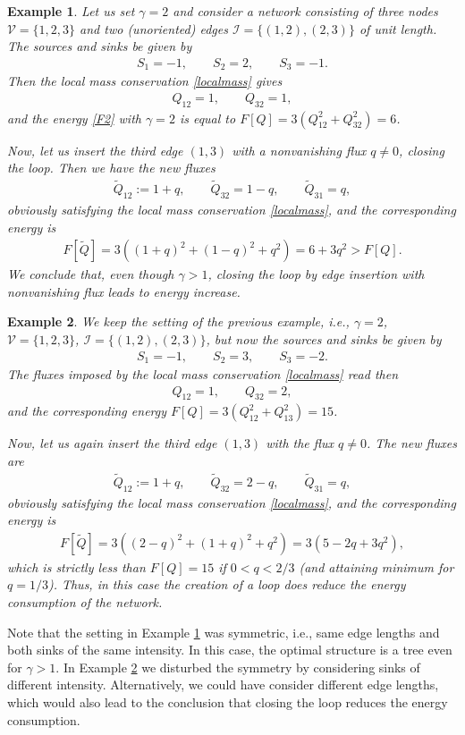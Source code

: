 \documentclass{article}
\numberwithin{equation}{section}
\newtheorem{example}{Example}%
\def\[{\begin{eqnarray*}}
\def\]{\end{eqnarray*}}
\begin{document}
\begin{example}\label{ex:1}
Let us set $\gamma=2$ and consider a network consisting of three nodes $\mathcal{V} = \{1,2,3\}$ and two (unoriented) edges $\mathcal{I}=\{(1,2),(2,3)\}$ of unit length.
The sources and sinks be given by
\[
   S_1=-1,\qquad S_2=2,\qquad S_3=-1.
\]
Then the local mass conservation \eqref{localmass} gives
\[
   Q_{12} = 1,\qquad Q_{32} = 1,
\]
and the energy \eqref{F2} with $\gamma=2$ is equal to $F[Q] = 3(Q_{12}^2 + Q_{32}^2) = 6$.

Now, let us insert the third edge $(1,3)$ with a nonvanishing flux $q\neq 0$, closing the loop.
Then we have the new fluxes
\[
   \widetilde Q_{12} := 1+q, \qquad \widetilde Q_{32} = 1-q,\qquad \widetilde Q_{31} = q,
\]
obviously satisfying the local mass conservation \eqref{localmass},
and the corresponding energy is
\[
   F[\widetilde Q] = 3\left( (1+q)^2 + (1-q)^2 + q^2 \right) = 6 + 3q^2 > F[Q].
\]
We conclude that, even though $\gamma>1$, closing the loop by edge insertion with nonvanishing flux leads to energy increase.
\end{example}
\vspace{2mm}

\begin{example}\label{ex:2}
We keep the setting of the previous example, i.e., $\gamma=2$, $\mathcal{V} = \{1,2,3\}$, $\mathcal{I}=\{(1,2),(2,3)\}$,
but now the sources and sinks be given by
\[
   S_1=-1,\qquad S_2=3,\qquad S_3=-2.
\]
The fluxes imposed by the local mass conservation \eqref{localmass} read then
\[
   Q_{12} = 1,\qquad Q_{32} = 2,
\]
and the corresponding energy $F[Q] = 3(Q_{12}^2 + Q_{13}^2) = 15$.

Now, let us again insert the third edge $(1,3)$ with the flux $q\neq 0$.
The new fluxes are
\[
   \widetilde Q_{12} := 1+q, \qquad \widetilde Q_{32} = 2-q,\qquad \widetilde Q_{31} = q,
\]
obviously satisfying the local mass conservation \eqref{localmass},
and the corresponding energy is
\[
   F[\widetilde Q] = 3\left( (2-q)^2 + (1+q)^2 + q^2 \right) = 3(5 - 2q + 3q^2),
\]
which is strictly less than $F[Q] = 15$ if $0<q<2/3$ (and attaining minimum for $q=1/3$).
Thus, in this case the creation of a loop does reduce the energy consumption of the network.
\end{example}

Note that the setting in Example \ref{ex:1} was symmetric, i.e., same edge lengths
and both sinks of the same intensity. In this case, the optimal structure is a tree even for $\gamma>1$.
In Example \ref{ex:2} we disturbed the symmetry by considering sinks of different intensity.
Alternatively, we could have consider different edge lengths, which would also lead
to the conclusion that closing the loop reduces the energy consumption.
\end{document}
